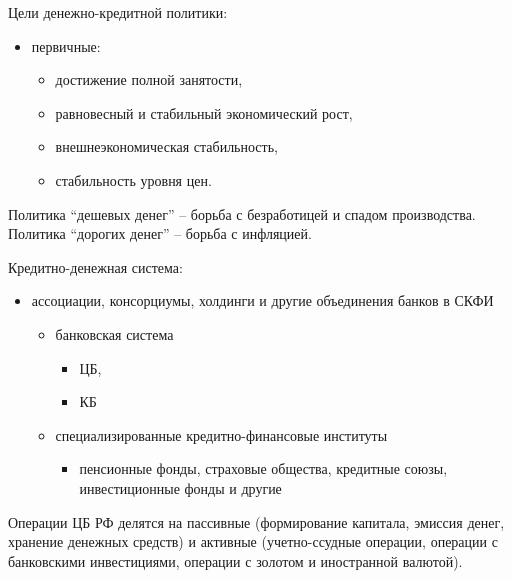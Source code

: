 Цели денежно-кредитной политики:
\begin{itemize}
   \item первичные:
   \begin{itemize}
        \item достижение полной занятости,
        \item равновесный и стабильный экономический рост,
        \item внешнеэкономическая стабильность,
        \item стабильность уровня цен.
    \end{itemize}
\end{itemize}

Политика ``дешевых денег'' -- борьба с безработицей и спадом производства.
Политика ``дорогих денег'' -- борьба с инфляцией.

Кредитно-денежная система:
\begin{itemize}
    \item ассоциации, консорциумы, холдинги и другие объединения банков в СКФИ
    \begin{itemize}
        \item банковская система
        \begin{itemize}
            \item ЦБ,
            \item КБ
        \end{itemize}
        \item специализированные кредитно-финансовые институты
        \begin{itemize}
            \item пенсионные фонды, страховые общества, кредитные союзы,
            инвестиционные фонды и другие
        \end{itemize}
    \end{itemize}
\end{itemize}

Операции ЦБ РФ делятся на пассивные (формирование капитала, эмиссия денег,
хранение денежных средств) и активные (учетно-ссудные операции, операции с
банковскими инвестициями, операции с золотом и иностранной валютой).
